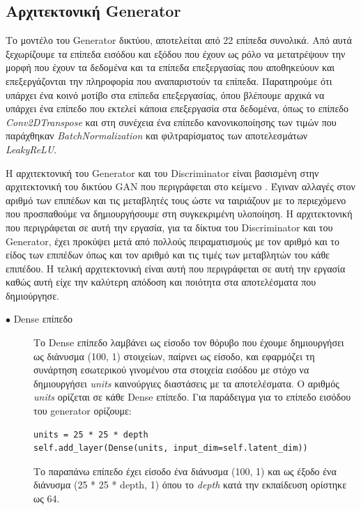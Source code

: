 \subsection{Αρχιτεκτονική Generator}
Το μοντέλο του Generator δικτύου, αποτελείται από 22 επίπεδα συνολικά. Από αυτά ξεχωρίζουμε τα επίπεδα εισόδου και εξόδου που έχουν ως ρόλο να μετατρέψουν την μορφή που έχουν τα δεδομένα και τα επίπεδα επεξεργασίας που αποθηκεύουν και επεξεργάζονται την πληροφορία που αναπαριστούν τα επίπεδα. Παρατηρούμε ότι υπάρχει ένα κοινό μοτίβο στα επίπεδα επεξεργασίας, όπου βλέπουμε αρχικά να υπάρχει ένα επίπεδο που εκτελεί κάποια επεξεργασία στα δεδομένα, όπως το επίπεδο \textit{Conv2DTranspose} και στη συνέχεια ένα επίπεδο κανονικοποίησης των τιμών που παράχθηκαν \textit{BatchNormalization} και φιλτραρίσματος των αποτελεσμάτων \textit{LeakyReLU}.
\par
Η αρχιτεκτονική του Generator και του Discriminator είναι βασισμένη στην αρχιτεκτονική του δικτύου GAN που περιγράφεται στο κείμενο \cite{mnist}. Έγιναν αλλαγές στον αριθμό των επιπέδων και τις μεταβλητές τους ώστε να ταιριάζουν με το περιεχόμενο που προσπαθούμε να δημιουργήσουμε στη συγκεκριμένη υλοποίηση. Η αρχιτεκτονική που περιγράφεται σε αυτή την εργασία, για τα δίκτυα του Discriminator και του Generator, έχει προκύψει μετά από πολλούς πειραματισμούς με τον αριθμό και το είδος των επιπέδων όπως και τον αριθμό και τις τιμές των μεταβλητών του κάθε επιπέδου. Η τελική αρχιτεκτονική είναι αυτή που περιγράφεται σε αυτή την εργασία καθώς αυτή είχε την καλύτερη απόδοση και ποιότητα στα αποτελέσματα που δημιούργησε.

\begin{description}
\item[$\bullet$ Dense επίπεδο] Το Dense επίπεδο λαμβάνει ως είσοδο τον θόρυβο που έχουμε δημιουργήσει ως διάνυσμα (100, 1) στοιχείων, παίρνει ως είσοδο, και εφαρμόζει τη συνάρτηση εσωτερικού γινομένου στα στοιχεία εισόδου με στόχο να δημιουργήσει \textit{units} καινούργιες διαστάσεις με τα αποτελέσματα. Ο αριθμός \textit{units} ορίζεται σε κάθε Dense επίπεδο. Για παράδειγμα για το επίπεδο εισόδου του generator ορίζουμε:
\begin{verbatim}
units = 25 * 25 * depth
self.add_layer(Dense(units, input_dim=self.latent_dim))
\end{verbatim}
\par
Το παραπάνω επίπεδο έχει είσοδο ένα διάνυσμα (100, 1) και ως έξοδο ένα διάνυσμα (25 * 25 * depth, 1) όπου το \textit{depth} κατά την εκπαίδευση ορίστηκε ως 64. \cite{dense}
\end{description}

